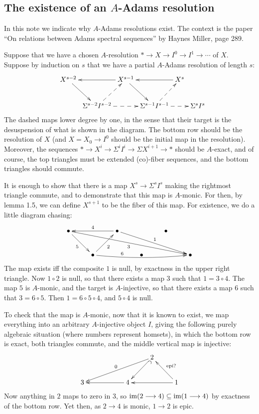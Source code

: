 \documentclass[11pt]{article}
\newcommand{\myheading}[1]
{{\noindent\Large #1}

}
\renewcommand{\myheading}[1]{\subsection{#1}}
\begin{document}
\myheading{The existence of an \texorpdfstring{$A$}{A}-Adams resolution}
In this note we indicate why $A$-Adams resolutions exist. The context is the
paper ``On relations between Adams spectral sequences'' by Haynes Miller, page
289.

Suppose that we have a chosen $A$-resolution $*\to X\to I^0\to I^1\to\cdots$ of
$X$. Suppose by induction on $s$ that we have a partial $A$-Adams resolution of
length $s$:
\[\xymatrix@C=.1cm{
&X^{s-2}\ar[dr]&&X^{s-1}\ar[dr]\ar[ll]&&X^s\ar[ll]\\
&&\Sigma^{s-2}I^{s-2}\ar@{-->}[rr]\ar@{-->}[ur]
&&\Sigma^{s-1}I^{s-1}\ar@{-->}[rr]\ar@{-->}[ur]&&\Sigma^{s}I^{s}
}\]
The dashed maps lower degree by one, in the sense that their target is the
desuspension of what is shown in the diagram. The bottom row should be the
resolution of $X$ (and $X=X_0\to I^0$ should be the initial map in the
resolution). Moreover, the sequences $*\to X^i\to\Sigma^iI^i\to\Sigma
X^{i+1}\to*$ should be $A$-exact, and of course, the top triangles must be
extended (co)-fiber sequences, and the bottom triangles should commute.

It is enough to show that there is a map $X^s\to \Sigma^sI^s$ making the
rightmost triangle commute, and to demonstrate that this map is $A$-monic. For
then, by lemma 1.5, we can define $X^{s+1}$ to be the fiber of this map. For
existence, we do a little diagram chasing:
\[\xymatrix{
\bullet\ar[rd]_5\ar[rrrrrd]_3&&\bullet\ar[rrrd]^1\ar[ll]_4&&\bullet\\
&\bullet\ar[ru]_2\ar@/_.31pc/[rrrr]^(.3){6}&&\bullet&&\bullet
}\]
The map exists iff the composite $1$ is null, by exactness in the upper right
triangle. Now $1\circ2$ is null, so that there exists a map $3$ such that
$1=3\circ4$. The map $5$ is $A$-monic, and the target is $A$-injective, so that
there exists a map $6$ such that $3=6\circ5$. Then $1=6\circ5\circ4$, and
$5\circ4$ is null.

To check that the map is $A$-monic, now that it is known to exist, we map
everything into an arbitrary $A$-injective object $I$, giving the following
purely algebraic situation (where numbers represent homsets), in which the
bottom row is exact, both triangles commute, and the middle vertical map is
injective:
\[\xymatrix{
&&&2\ar[lldl]_0\ar@{^{(}->}[ld]\\
3&&\ar[ll]4&&1\ar[ll]\ar[lu]_{\text{epi?}}
}\]
Now anything in $2$ maps to zero in 3, so $\operatorname{im}(2\longrightarrow4)\subseteq\operatorname{im}(1\longrightarrow4)$ by
exactness of the bottom row. Yet then, as $2\to4$ is monic, $1\to2$ is epic.
\end{document}
